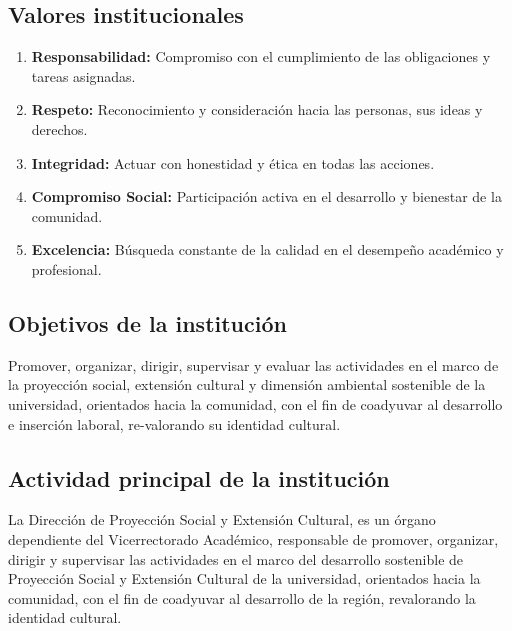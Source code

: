 \subsection{Valores institucionales}
\begin{enumerate}
    \item \textbf{Responsabilidad:} Compromiso con el cumplimiento de las obligaciones y tareas asignadas.
    \item \textbf{Respeto:} Reconocimiento y consideración hacia las personas, sus ideas y derechos.
    \item \textbf{Integridad:} Actuar con honestidad y ética en todas las acciones.
    \item \textbf{Compromiso Social:} Participación activa en el desarrollo y bienestar de la comunidad.
    \item \textbf{Excelencia:} Búsqueda constante de la calidad en el desempeño académico y profesional.
    
\end{enumerate}

\subsection{Objetivos de la institución}
Promover, organizar, dirigir, supervisar y evaluar las actividades en el marco de la proyección social, extensión cultural y dimensión ambiental sostenible de la universidad, orientados hacia la comunidad, con el fin de coadyuvar al desarrollo e inserción laboral, re-valorando su identidad cultural.

\subsection{Actividad principal de la institución}
La Dirección de Proyección Social y Extensión Cultural, es un órgano dependiente del Vicerrectorado Académico, responsable de promover, organizar, dirigir y supervisar las actividades en el marco del desarrollo sostenible de Proyección Social y Extensión Cultural de la universidad, orientados hacia la comunidad, con el fin de coadyuvar al desarrollo de la región, revalorando la identidad cultural.


